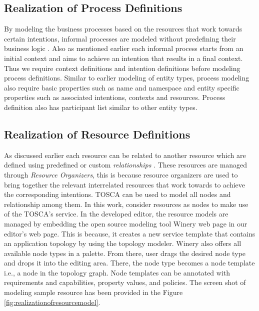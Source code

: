 \subsection{Realization of Process Definitions}
By modeling the business processes based on the resources that work towards certain intentions, informal processes are modeled without predefining their business logic \cite{Sungur2014a}. Also as mentioned earlier each informal process starts from an initial context and aims to achieve an intention that results in a final context. Thus we require context definitions and intention definitions before modeling process definitions. Similar to earlier modeling of entity types, process modeling also require basic properties such as name and namespace  and entity specific properties such as associated intentions, contexts and resources. Process definition also has participant list similar to other entity types. 

\subsection{Realization of Resource Definitions}
As discussed earlier each resource can be related to another resource which are defined using predefined or custom \textit{relationships} \cite{Sungur2014a}. These resources are managed through \textit{Resource Organizers}, this is because resource organizers are used to bring together the relevant interrelated resources that work towards to achieve the corresponding intentions. TOSCA \cite{Binz2014} can be used to model all nodes and relationship among them. In this work, consider resources as nodes to make use of the TOSCA's service. In the developed editor, the resource models are managed by embedding the open source modeling tool Winery web page \cite{Kopp2013} in our editor's web page. This is because, it creates a new service template that contains an application topology by using the topology modeler. Winery also offers all available node types in a palette. From there, user drags the desired node type and drops it into the editing area. There, the node type
becomes a node template i.e., a node in the topology graph. Node templates can be annotated with requirements and capabilities, property values, and policies. The screen shot of modeling sample resource has been provided in the Figure \ref{fig:realizationofresourcemodel}. 

